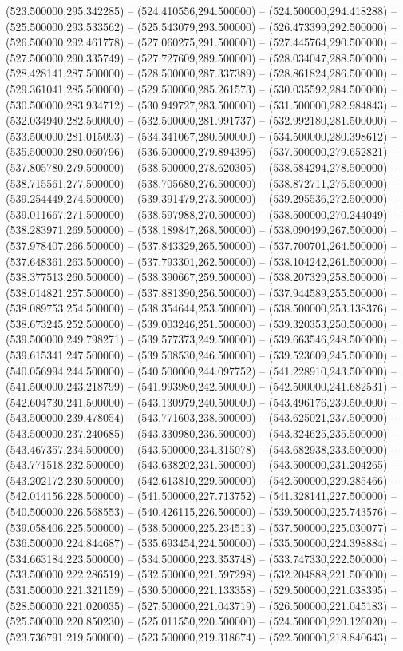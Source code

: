 (523.500000,295.342285) -- (524.410556,294.500000) -- (524.500000,294.418288) -- (525.500000,293.533562) -- (525.543079,293.500000) -- (526.473399,292.500000) -- (526.500000,292.461778) -- (527.060275,291.500000) -- (527.445764,290.500000) -- (527.500000,290.335749) -- (527.727609,289.500000) -- (528.034047,288.500000) -- (528.428141,287.500000) -- (528.500000,287.337389) -- (528.861824,286.500000) -- (529.361041,285.500000) -- (529.500000,285.261573) -- (530.035592,284.500000) -- (530.500000,283.934712) -- (530.949727,283.500000) -- (531.500000,282.984843) -- (532.034940,282.500000) -- (532.500000,281.991737) -- (532.992180,281.500000) -- (533.500000,281.015093) -- (534.341067,280.500000) -- (534.500000,280.398612) -- (535.500000,280.060796) -- (536.500000,279.894396) -- (537.500000,279.652821) -- (537.805780,279.500000) -- (538.500000,278.620305) -- (538.584294,278.500000) -- (538.715561,277.500000) -- (538.705680,276.500000) -- (538.872711,275.500000) -- (539.254449,274.500000) -- (539.391479,273.500000) -- (539.295536,272.500000) -- (539.011667,271.500000) -- (538.597988,270.500000) -- (538.500000,270.244049) -- (538.283971,269.500000) -- (538.189847,268.500000) -- (538.090499,267.500000) -- (537.978407,266.500000) -- (537.843329,265.500000) -- (537.700701,264.500000) -- (537.648361,263.500000) -- (537.793301,262.500000) -- (538.104242,261.500000) -- (538.377513,260.500000) -- (538.390667,259.500000) -- (538.207329,258.500000) -- (538.014821,257.500000) -- (537.881390,256.500000) -- (537.944589,255.500000) -- (538.089753,254.500000) -- (538.354644,253.500000) -- (538.500000,253.138376) -- (538.673245,252.500000) -- (539.003246,251.500000) -- (539.320353,250.500000) -- (539.500000,249.798271) -- (539.577373,249.500000) -- (539.663546,248.500000) -- (539.615341,247.500000) -- (539.508530,246.500000) -- (539.523609,245.500000) -- (540.056994,244.500000) -- (540.500000,244.097752) -- (541.228910,243.500000) -- (541.500000,243.218799) -- (541.993980,242.500000) -- (542.500000,241.682531) -- (542.604730,241.500000) -- (543.130979,240.500000) -- (543.496176,239.500000) -- (543.500000,239.478054) -- (543.771603,238.500000) -- (543.625021,237.500000) -- (543.500000,237.240685) -- (543.330980,236.500000) -- (543.324625,235.500000) -- (543.467357,234.500000) -- (543.500000,234.315078) -- (543.682938,233.500000) -- (543.771518,232.500000) -- (543.638202,231.500000) -- (543.500000,231.204265) -- (543.202172,230.500000) -- (542.613810,229.500000) -- (542.500000,229.285466) -- (542.014156,228.500000) -- (541.500000,227.713752) -- (541.328141,227.500000) -- (540.500000,226.568553) -- (540.426115,226.500000) -- (539.500000,225.743576) -- (539.058406,225.500000) -- (538.500000,225.234513) -- (537.500000,225.030077) -- (536.500000,224.844687) -- (535.693454,224.500000) -- (535.500000,224.398884) -- (534.663184,223.500000) -- (534.500000,223.353748) -- (533.747330,222.500000) -- (533.500000,222.286519) -- (532.500000,221.597298) -- (532.204888,221.500000) -- (531.500000,221.321159) -- (530.500000,221.133358) -- (529.500000,221.038395) -- (528.500000,221.020035) -- (527.500000,221.043719) -- (526.500000,221.045183) -- (525.500000,220.850230) -- (525.011550,220.500000) -- (524.500000,220.126020) -- (523.736791,219.500000) -- (523.500000,219.318674) -- (522.500000,218.840643) -- 